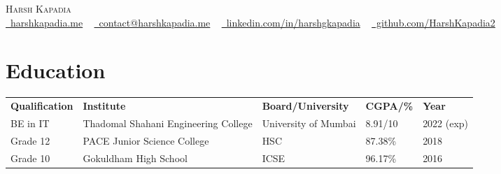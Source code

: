 \documentclass[letterpaper,11pt]{article}
\begin{document}

\begin{center}
    {\Huge \scshape Harsh Kapadia} \\ \vspace{2pt}
    \small
    \faGlobe \href{https://harshkapadia.me}{\raisebox{-0.1\height}\ harshkapadia.me} ~
    \faEnvelope \href{mailto:contact@harshkapadia.me}{\raisebox{-0.2\height}\  contact@harshkapadia.me} ~
    \faLinkedin \href{https://linkedin.com/in/harshgkapadia}{\raisebox{-0.2\height}\ linkedin.com/in/harshgkapadia} ~
    \faGithub \href{https://github.com/HarshKapadia2}{\raisebox{-0.2\height}\ github.com/HarshKapadia2}
    \vspace{-13pt}
\end{center}


\section{Education}
    \vspace{-2pt}
    \begin{itemize}[leftmargin=0.2in, label={}]
        {\item{
            \begin{tabular}{ l@{\hskip 0.2in} l@{\hskip 0.2in} l@{\hskip 0.2in} l@{\hskip 0.2in} l }
                 \textbf{Qualification} & \textbf{Institute} & \textbf{Board/University} & \textbf{CGPA/\%} & \textbf{Year} \\ 
                 BE in IT & Thadomal Shahani Engineering College & University of Mumbai & 8.91/10 & 2022 (exp) \\
                 Grade 12 & PACE Junior Science College & HSC & 87.38\% & 2018 \\
                 Grade 10 & Gokuldham High School & ICSE & 96.17\% & 2016
            \end{tabular}
        }}
    \end{itemize}
\vspace{-20pt}
\end{document}

